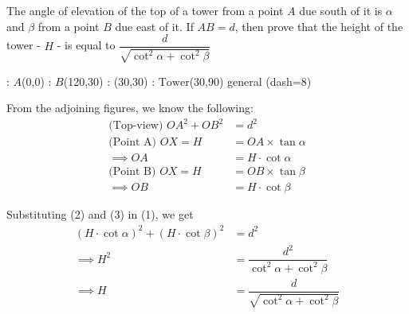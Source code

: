 

\question[3]  The angle of elevation of the top of a tower from a point $A$
due south of it is $\alpha$ and $\beta$ from a point $B$ due east of it. If $AB=d$, 
then prove that the height of the tower - $H$ - is equal to 
$\dfrac{d}{\sqrt{\cot^2\alpha + \cot^2\beta}}$

\vspace{0.7cm}
  : $A$(0,0)
  : $B$(120,30)
  : (30,30)
  : $\text{Tower}$(30,90)
\figdrawbegin{}
  \figdrawline [1,4,3,1]
  \figdrawline [3,2,4]
  \ifprintanswers
    \figset general (dash=8)
    \figdrawline [1,2]
  \fi
\figdrawend
{}
\centerline{\box\figBoxA}

\begin{solution}[\fullpage]
	From the adjoining figures, we know the following:
	\begin{align}
		\text{(Top-view) } OA^2 + OB^2 &= d^2 \\
		\text{(Point A) } OX = H &= OA \times\tan\alpha \\
    \implies OA &= H\cdot\cot\alpha \\
		\text{(Point B) } OX = H &= OB \times\tan\beta \\
    \implies OB &= H\cdot\cot\beta
	\end{align}
	
	Substituting (2) and (3) in (1), we get
	\begin{align}
		(H\cdot\cot\alpha)^2 + (H\cdot\cot\beta)^2 &= d^2 \\
		\implies H^2 &= \dfrac{d^2}{\cot^2\alpha + \cot^2\beta} \\
		\implies H &= \dfrac{d}{\sqrt{\cot^2\alpha + \cot^2\beta}}
	\end{align}
\end{solution}
